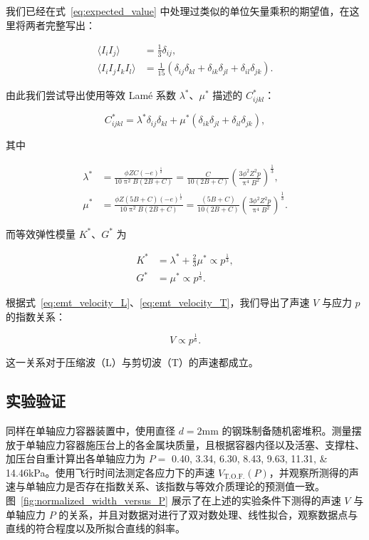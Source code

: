 我们已经在式~\eqref{eq:expected_value} 中处理过类似的单位矢量乘积的期望值，在这里将两者完整写出：

\begin{align}
  \langle I_{i}I_{j}\rangle &= \frac{1}{3}\delta_{ij},\\
  \langle I_{i}I_{j}I_{k}I_{l}\rangle &= \frac{1}{15}\left(\delta_{ij}\delta_{kl} + \delta_{ik}\delta_{jl} + \delta_{il}\delta_{jk}\right).
\end{align}

由此我们尝试导出使用等效 Lamé 系数 $\lambda^{*}$、$\mu^{*}$ 描述的 $C_{ijkl}^{*}$：

\begin{equation}
  C_{ijkl}^{*} = \lambda^{*}\delta_{ij}\delta_{kl} + \mu^{*}(\delta_{ik}\delta_{jl} + \delta_{il}\delta_{jk}),
\end{equation}

其中

\begin{align}
  \lambda^{*} &= \frac{\phi ZC(-e)^{\frac{1}{2}}}{10\uppi^{2}B(2B+C)} = \frac{C}{10(2B+C)}\left(\frac{3\phi^{2}Z^{2}p}{\uppi^{4}B^{2}}\right)^{\frac{1}{3}},\\
  \mu^{*} &= \frac{\phi Z(5B+C)(-e)^{\frac{1}{2}}}{10\uppi^{2}B(2B+C)} =\frac{(5B+C)}{10(2B+C)}\left(\frac{3\phi^{2}Z^{2}p}{\uppi^{4}B^{2}}\right)^{\frac{1}{3}}.
\end{align}

而等效弹性模量 $K^{*}$、$G^{*}$ 为

\begin{align}
  K^{*} &= \lambda^{*} + \frac{2}{3}\mu^{*}\propto p^{\frac{1}{3}},\\
  G^{*} &= \mu^{*} \propto p^{\frac{1}{3}}.
\end{align}

根据式~\eqref{eq:emt_velocity_L}、\eqref{eq:emt_velocity_T}，我们导出了声速 $V$ 与应力 $p$ 的指数关系：

\begin{equation}
  V\propto p^{\frac{1}{6}}.
\end{equation}

这一关系对于压缩波（L）与剪切波（T）的声速都成立。


\subsection{实验验证}\label{sec:stress_velocity_relation}

同样在单轴应力容器装置中，使用直径 $d=2\unit{\milli\meter}$ 的钢珠制备随机密堆积。测量摆放于单轴应力容器施压台上的各金属块质量，且根据容器内径以及活塞、支撑柱、加压台自重计算出各单轴应力为 $P=$ \numlist{0.40;3.34;6.30;8.43;9.63;11.31;14.46}\unit{\kilo\pascal}。使用飞行时间法测定各应力下的声速 $V_{\text{T.O.F.}}(P)$，并观察所测得的声速与单轴应力是否存在指数关系、该指数与等效介质理论的预测值一致。图~\ref{fig:normalized_width_versus_P} 展示了在上述的实验条件下测得的声速 $V$ 与单轴应力 $P$ 的关系，并且对数据对进行了双对数处理、线性拟合，观察数据点与直线的符合程度以及所拟合直线的斜率。

